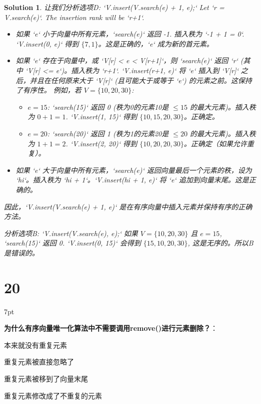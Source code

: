 \documentclass[UTF8]{report}
\newtheorem{solution}{Solution}
\theoremstyle{MyLineTheoremStyle} %
\theoremstyle{MyBlockTheoremStyle} %
\theoremstyle{MySubsubsectionStyle} %
\newenvironment{graybox}{%
        \def\FrameCommand{%
        \hspace{1pt}%
        {\color{gray}\small \vrule width 2pt}%
        {\color{graybox_color}\vrule width 4pt}%
        \colorbox{graybox_color}%
        }%
        \MakeFramed{\advance\hsize-\width\FrameRestore}%
        \noindent\hspace{-4.55pt}%
        \begin{adjustwidth}{}{7pt}%
        \vspace{2pt}\vspace{2pt}%
        }
        {%
        \vspace{2pt}\end{adjustwidth}\endMakeFramed%
        }
\begin{document}
\begin{solution}
让我们分析选项D: `V.insert(V.search(e) + 1, e);`
Let `r = V.search(e)`. The insertion rank will be `r+1`.
\begin{itemize}
    \item 如果 `e` 小于向量中所有元素，`search(e)` 返回 -1. 插入秩为 `-1 + 1 = 0`. `V.insert(0, e)` 得到 $\{7, 1\}$。这是正确的，`e` 成为新的首元素。
    \item 如果 `e` 存在于向量中，或 `V[r] < e < V[r+1]`，则 `search(e)` 返回 `r` (其中 `V[r] <= e`)。插入秩为 `r+1`. `V.insert(r+1, e)` 将 `e` 插入到 `V[r]` 之后，并且在任何原来大于 `V[r]` (且可能大于或等于 `e`) 的元素之前。这保持了有序性。
    例如，若 $V=\{10, 20, 30\}$:
    \begin{itemize}
        \item $e=15$: `search(15)` 返回 0 (秩为0的元素10是 $\le 15$ 的最大元素)。插入秩为 $0+1=1$. `V.insert(1, 15)` 得到 $\{10, 15, 20, 30\}$。正确定。
        \item $e=20$: `search(20)` 返回 1 (秩为1的元素20是 $\le 20$ 的最大元素)。插入秩为 $1+1=2$. `V.insert(2, 20)` 得到 $\{10, 20, 20, 30\}$。正确定（如果允许重复）。
    \end{itemize}
    \item 如果 `e` 大于向量中所有元素，`search(e)` 返回向量最后一个元素的秩，设为 `hi`。插入秩为 `hi + 1`。`V.insert(hi + 1, e)` 将 `e` 追加到向量末尾。这是正确的。
\end{itemize}

因此，`V.insert(V.search(e) + 1, e)` 是在有序向量中插入元素并保持有序的正确方法。

分析选项B: `V.insert(V.search(e), e);`
如果 $V=\{10, 20, 30\}$ 且 $e=15$, `search(15)` 返回 0. `V.insert(0, 15)` 会得到 $\{15, 10, 20, 30\}$, 这是无序的。所以B是错误的。
\end{solution}

\section*{20}

\begin{graybox}
\textbf{为什么有序向量唯一化算法中不需要调用remove()进行元素删除？}：
\begin{circledenum}
    \item 本来就没有重复元素
    \item 重复元素被直接忽略了
    \item 重复元素被移到了向量末尾
    \item 重复元素修改成了不重复的元素
\end{circledenum}
\end{graybox}
\end{document}

